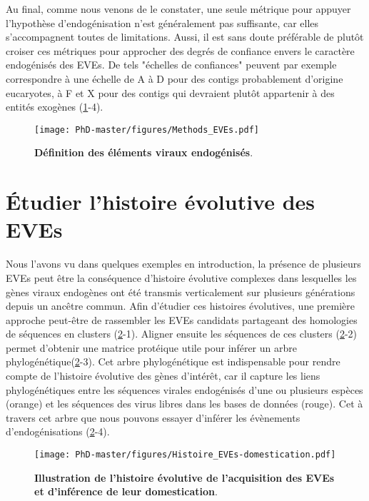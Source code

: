 Au final, comme nous venons de le constater, une seule métrique pour appuyer l'hypothèse d'endogénisation n'est généralement pas suffisante, car elles s'accompagnent toutes de limitations. Aussi, il est sans doute préférable de plutôt croiser ces métriques pour approcher des degrés de confiance envers le caractère endogénisés des EVEs. De tels "échelles de confiances" peuvent par exemple correspondre à une échelle de A à D pour des contigs probablement d'origine eucaryotes, à F et X pour des contigs qui devraient plutôt appartenir à des entités exogènes (\figurename{\ref{figure:Methods_EVEs}}-4). 
    

\begin{figure}[!htpb]
\captionsetup{font=footnotesize}
 \centering
  \texttt{[image: PhD-master/figures/Methods\_EVEs.pdf]}
\caption[Methode:Définition des éléments viraux endogénisés]{\textbf{Définition des éléments viraux endogénisés}.}
\label{figure:Methods_EVEs}
\end{figure}


\section{Étudier l'histoire évolutive des EVEs}

Nous l'avons vu dans quelques exemples en introduction, la présence de plusieurs EVEs peut être la conséquence d'histoire évolutive complexes dans lesquelles les gènes viraux endogènes ont été transmis verticalement sur plusieurs générations depuis un ancêtre commun. Afin d'étudier ces histoires évolutives, une première approche peut-être de rassembler les EVEs candidats partageant des homologies de séquences en clusters (\figurename{\ref{figure:Histoire_EVEs-domestication}}-1). Aligner ensuite les séquences de ces clusters (\figurename{\ref{figure:Histoire_EVEs-domestication}}-2) permet d'obtenir une matrice protéique utile pour inférer un arbre phylogénétique(\figurename{\ref{figure:Histoire_EVEs-domestication}}-3). Cet arbre phylogénétique est indispensable pour rendre compte de l'histoire évolutive des gènes d'intérêt, car il capture les liens phylogénétiques entre les séquences virales endogénisés d'une ou plusieurs espèces (orange) et les séquences des virus libres dans les bases de données (rouge). Cet à travers cet arbre que nous pouvons essayer d'inférer les évènements d'endogénisations (\figurename{\ref{figure:Histoire_EVEs-domestication}}-4). 

\begin{figure}[!htpb]
\captionsetup{font=footnotesize}
 \centering
  \texttt{[image: PhD-master/figures/Histoire\_EVEs-domestication.pdf]}
\caption[Methode:Illustration de l'histoire évolutive de l'acquisition des EVEs et dEVEs]{\textbf{Illustration de l'histoire évolutive de l'acquisition des EVEs et d'inférence de leur domestication}.}
\label{figure:Histoire_EVEs-domestication}
\end{figure}

